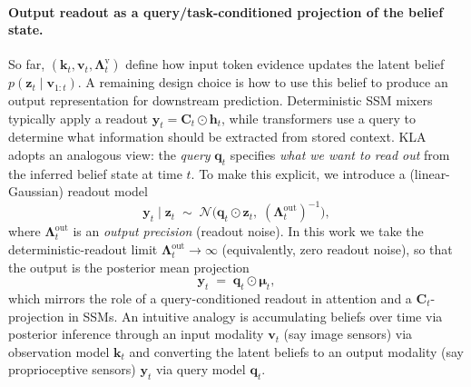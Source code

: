 \documentclass{article}
\begin{document}
\paragraph{Output readout as a query/task-conditioned projection of the belief state.}
So far, $(\mathbf{k}_t,\mathbf{v}_t,\boldsymbol{\Lambda}_t^{\mathrm v})$ define how input token evidence updates the latent belief $p(\mathbf{z}_t\mid \mathbf{v}_{1:t})$.
A remaining design choice is how to use this belief to produce an output representation for downstream prediction.
Deterministic SSM mixers typically apply a readout $\mathbf{y}_t=\mathbf{C}_t\odot \mathbf{h}_t$, while transformers use a query to determine what information should be extracted from stored context.
KLA adopts an analogous view: the \emph{query} $\mathbf{q}_t$ specifies \emph{what we want to read out} from the inferred belief state at time $t$.
To make this explicit, we introduce a (linear-Gaussian) readout model
\begin{equation}
\mathbf{y}_t \mid \mathbf{z}_t \;\sim\; \mathcal{N}\!\bigl(\mathbf{q}_t \odot \mathbf{z}_t,\; (\boldsymbol{\Lambda}^{\mathrm{out}}_t)^{-1}\bigr),
\label{eq:readout_model}
\end{equation}
where $\boldsymbol{\Lambda}^{\mathrm{out}}_t$ is an \emph{output precision} (readout noise).
In this work we take the deterministic-readout limit $\boldsymbol{\Lambda}^{\mathrm{out}}_t \to \infty$ (equivalently, zero readout noise), so that the output is the posterior mean projection
\begin{equation}
\mathbf{y}_t \;=\; \mathbf{q}_t \odot \boldsymbol{\mu}_t,
\label{eq:readout}
\end{equation}
which mirrors the role of a query-conditioned readout in attention and a $\mathbf{C}_t$-projection in SSMs. An intuitive analogy is accumulating beliefs over time via posterior inference through an input modality $\mathbf{v}_{t}$ (say image sensors) via observation model $\mathbf{k}_{t}$ and converting the latent beliefs to an output modality (say proprioceptive sensors) $\mathbf{y}_{t}$ via query model $\mathbf{q}_t$.
\end{document}

